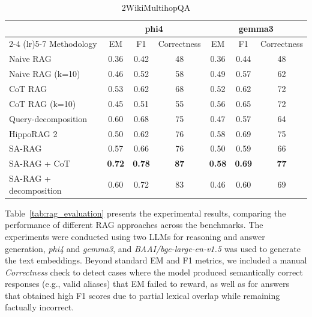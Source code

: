 \documentclass{article}
\begin{document}
\begin{table}[h!]
    \begin{subtable}[t]{\textwidth}
    \centering
    \caption{2WikiMultihopQA}
    \label{tab:rag_bench1}
    \begin{tabular}{lcccccc}
        \toprule
        & \multicolumn{3}{c}{phi4} & \multicolumn{3}{c}{gemma3} \\
        \cmidrule(lr){2-4} \cmidrule(lr){5-7}
        Methodology & EM & F1 & Correctness & EM & F1 & Correctness \\
        \midrule
        Naive RAG              & 0.36 & 0.42 & 48 & 0.36 & 0.44 & 48 \\
        Naive RAG (k=10)       & 0.46 & 0.52 & 58 & 0.49 & 0.57 & 62 \\
        CoT RAG                & 0.53 & 0.62 & 68 & 0.52 & 0.62 & 72 \\
        CoT RAG (k=10)         & 0.45 & 0.51 & 55 & 0.56 & 0.65 & 72 \\
        Query-decomposition    & 0.60 & 0.68 & 75 & 0.47 & 0.57 & 64 \\
        HippoRAG 2           & 0.50 & 0.62 & 76 & 0.58 & 0.69 & 75
        \\
        SA-RAG                 & 0.57 & 0.66 & 76 & 0.50 & 0.59 & 66 \\
        SA-RAG + CoT           & \textbf{0.72} & \textbf{0.78} & \textbf{87} & \textbf{0.58} & \textbf{0.69} & \textbf{77} \\
        SA-RAG + decomposition & 0.60 & 0.72 & 83 & 0.46 & 0.60 & 69 \\
        \bottomrule
    \end{tabular}
\end{subtable}

\end{table}

Table~\ref{tab:rag_evaluation} presents the experimental results, comparing the performance of different RAG approaches across the benchmarks. The experiments were conducted using two LLMs for reasoning and answer generation, \textit{phi4} and \textit{gemma3}, and \textit{BAAI/bge-large-en-v1.5} was used to generate the text embeddings. Beyond standard EM and F1 metrics, we included a manual \textit{Correctness} check to detect cases where the model produced semantically correct responses (e.g., valid aliases) that EM failed to reward, as well as for answers that obtained high F1 scores due to partial lexical overlap while remaining factually incorrect.
\end{document}
